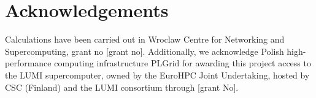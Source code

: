 \documentclass[10pt,twocolumn,letterpaper]{article}
\begin{document}
\section*{Acknowledgements}

Calculations have been carried out in Wroclaw Centre for Networking and Supercomputing, grant no [grant no]. Additionally, we acknowledge Polish high-performance computing infrastructure PLGrid for awarding this project access to the LUMI supercomputer, owned by the EuroHPC Joint Undertaking, hosted by CSC (Finland) and the LUMI consortium through [grant No]. 



{\small}
\end{document}
